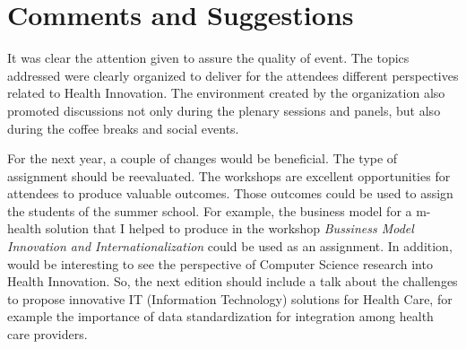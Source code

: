 \section*{Comments and Suggestions}

It was clear the attention given to assure the quality of event. The topics addressed were clearly organized to deliver for the attendees different perspectives related to Health Innovation. The environment created by the organization also promoted discussions not only during the plenary sessions and panels, but also during the coffee breaks and social events. 
 
For the next year, a couple of changes would be beneficial.
The type of assignment should be reevaluated. The workshops are excellent opportunities for attendees to produce valuable outcomes. Those outcomes could be used to assign the students of the summer school. 
For example, the business model for a m-health solution that I helped to produce in the workshop \textit{Bussiness Model Innovation and Internationalization} could be used as an assignment.
In addition, would be interesting to see the perspective of Computer Science research into Health Innovation. 
So, the next edition should include a talk about the challenges to propose innovative IT (Information Technology) solutions for Health Care, for example the importance of data standardization for integration among health care providers.